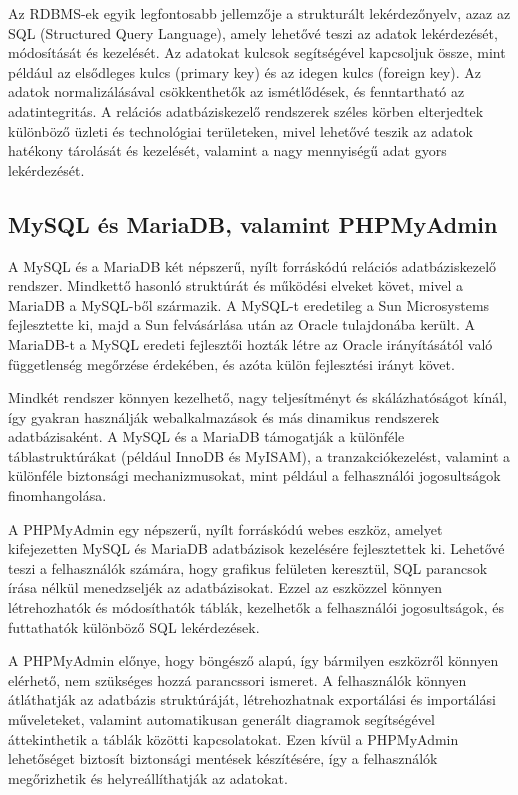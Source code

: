 \documentclass[colorlinks]{thesis-kando}
\theoremstyle{definition}
\theoremstyle{remark}
\begin{document}
Az RDBMS-ek egyik legfontosabb jellemzője a strukturált lekérdezőnyelv, azaz az SQL (Structured Query Language), amely lehetővé teszi az adatok lekérdezését, módosítását és kezelését. Az adatokat kulcsok segítségével kapcsoljuk össze, mint például az elsődleges kulcs (primary key) és az idegen kulcs (foreign key). Az adatok normalizálásával csökkenthetők az ismétlődések, és fenntartható az adatintegritás. A relációs adatbáziskezelő rendszerek széles körben elterjedtek különböző üzleti és technológiai területeken, mivel lehetővé teszik az adatok hatékony tárolását és kezelését, valamint a nagy mennyiségű adat gyors lekérdezését.
\pagebreak
\subsection{MySQL és MariaDB, valamint PHPMyAdmin}

A MySQL és a MariaDB két népszerű, nyílt forráskódú relációs adatbáziskezelő rendszer. Mindkettő hasonló struktúrát és működési elveket követ, mivel a MariaDB a MySQL-ből származik. A MySQL-t eredetileg a Sun Microsystems fejlesztette ki, majd a Sun felvásárlása után az Oracle tulajdonába került. A MariaDB-t a MySQL eredeti fejlesztői hozták létre az Oracle irányításától való függetlenség megőrzése érdekében, és azóta külön fejlesztési irányt követ.

Mindkét rendszer könnyen kezelhető, nagy teljesítményt és skálázhatóságot kínál, így gyakran használják webalkalmazások és más dinamikus rendszerek adatbázisaként. A MySQL és a MariaDB támogatják a különféle táblastruktúrákat (például InnoDB és MyISAM), a tranzakciókezelést, valamint a különféle biztonsági mechanizmusokat, mint például a felhasználói jogosultságok finomhangolása.

A PHPMyAdmin egy népszerű, nyílt forráskódú webes eszköz, amelyet kifejezetten MySQL és MariaDB adatbázisok kezelésére fejlesztettek ki. Lehetővé teszi a felhasználók számára, hogy grafikus felületen keresztül, SQL parancsok írása nélkül menedzseljék az adatbázisokat. Ezzel az eszközzel könnyen létrehozhatók és módosíthatók táblák, kezelhetők a felhasználói jogosultságok, és futtathatók különböző SQL lekérdezések.

A PHPMyAdmin előnye, hogy böngésző alapú, így bármilyen eszközről könnyen elérhető, nem szükséges hozzá parancssori ismeret. A felhasználók könnyen átláthatják az adatbázis struktúráját, létrehozhatnak exportálási és importálási műveleteket, valamint automatikusan generált diagramok segítségével áttekinthetik a táblák közötti kapcsolatokat. Ezen kívül a PHPMyAdmin lehetőséget biztosít biztonsági mentések készítésére, így a felhasználók megőrizhetik és helyreállíthatják az adatokat.
\end{document}

